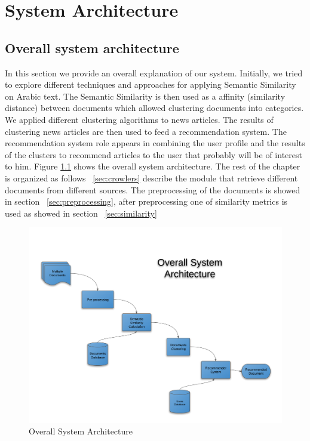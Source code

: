 
\chapter{System Architecture} %

\label{sysArch} %


\section{Overall system architecture}
In this section we provide an overall explanation of our system.  Initially, we tried to explore different techniques and approaches for applying Semantic Similarity on Arabic text. The Semantic Similarity is then used as a affinity (similarity distance) between documents which allowed clustering documents into categories. We applied different clustering algorithms to news articles. The results of clustering news articles are then used to feed a recommendation system. The recommendation system role appears in combining the user profile and the results of the clusters to recommend articles to the user that probably will be of interest to him. Figure \ref{fig:arch_1} shows the overall system architecture.
The rest of the chapter is organized as follows ~\ref{sec:crowlers} describe the module that retrieve different documents from different sources. The preprocessing of the documents is showed in section ~\ref{sec:preprocessing}, after preprocessing one of similarity metrics is used as showed in section ~\ref{sec:similarity}

\begin{figure}[htb]
\begin{center}
\includegraphics[totalheight=.5\textheight,
width=.5\textwidth]{./Figures/arch_1.png}
\end{center}
\caption{Overall System Architecture}
\label{fig:arch_1}
\end{figure}



